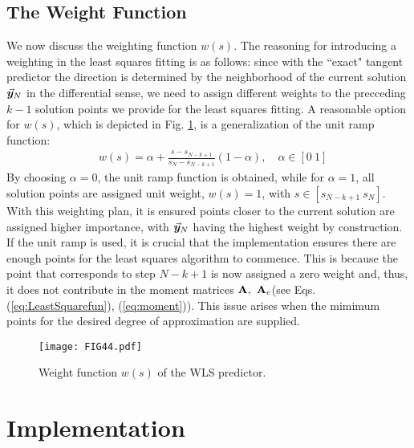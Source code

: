 \subsection{The Weight Function}\label{CH5-S2SS4}

We now discuss the weighting function $w(s)$. The reasoning for introducing a
weighting in the least squares fitting is as follows: since with
the ``exact" tangent predictor the direction is determined by the neighborhood 
of
the current solution $\vec{\bm{y}}_N$ in the differential sense, we need to assign
different weights to the precceding $k-1$ solution points we provide for the 
least squares fitting. A reasonable option for $w(s)$, which is depicted in 
Fig. \ref{fig:FIG44}, is a generalization of the unit ramp function:
\begin{align}
	&w(s) = \alpha + \frac{s-s_{N-k+1}}{s_N-s_{N-k+1}}(1-\alpha)
	\label{eq:WeightFunction},\quad \alpha\in[0\ 1]
\end{align}
By choosing $\alpha=0$, the unit ramp function is obtained, while for
$\alpha=1$, all solution points are assigned unit weight, $w(s)=1$, with 
$s\in[s_{N-k+1}\ s_N]$.
With this weighting plan, it is
ensured points closer to the current solution are assigned higher importance,
with $\vec{\bm{y}}_N$ having the highest weight by construction. If the unit ramp is
used, it is crucial that the implementation ensures there are enough points for
the least squares algorithm to commence. This is because the point that
corresponds to step $N-k+1$ is now assigned a zero weight and, thus, it does not
contribute in the moment matrices $\bmat{A},\ \bmat{A}_c$(see Eqs.
(\ref{eq:LeastSquarefun}), (\ref{eq:moment})). This issue arises when the 
mimimum
points for the desired degree of approximation are supplied. 

\begin{figure}[t]
	\centering
	\texttt{[image: FIG44.pdf]}
	\caption{Weight function $w(s)$ of the WLS predictor.}
	\label{fig:FIG44}
\end{figure}


\section{Implementation}\label{CH5-S3}

